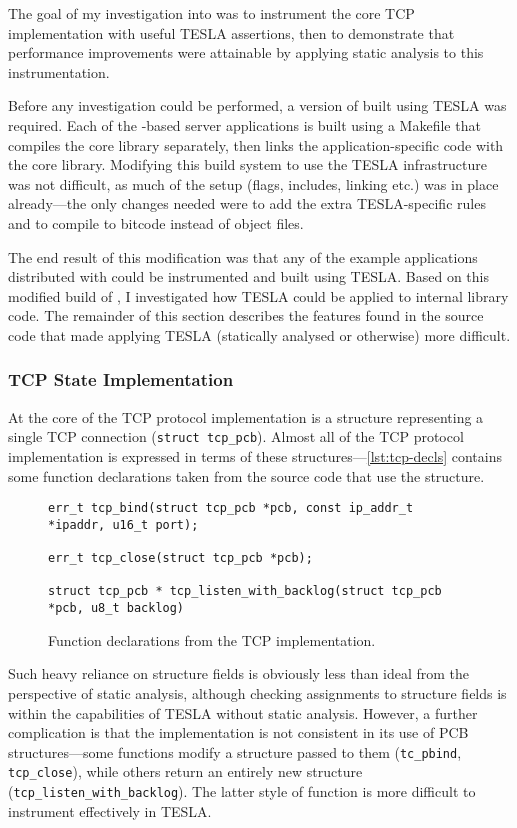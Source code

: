 The goal of my investigation into \lwip{} was to instrument the core TCP
implementation with useful TESLA assertions, then to demonstrate that
performance improvements were attainable by applying static analysis to
this instrumentation.

Before any investigation could be performed, a version of \lwip{} built using TESLA
was required. Each of the \lwip{}-based server applications is built using a
Makefile that compiles the core library separately, then links the
application-specific code with the core library. Modifying this build system to
use the TESLA infrastructure was not difficult, as much of the setup (flags,
includes, linking etc.) was in place already---the only changes needed were to
add the extra TESLA-specific rules and to compile to bitcode instead of object
files.

The end result of this modification was that any of the example applications
distributed with \lwip{} could be instrumented and built using TESLA. Based on
this modified build of \lwip{}, I investigated how TESLA could be applied to
internal library code. The remainder of this section describes the features
found in the source code that made applying TESLA (statically analysed or
otherwise) more difficult.

\subsubsection{TCP State Implementation}

At the core of the TCP protocol implementation is a structure
representing a single TCP connection (\texttt{struct tcp_pcb}).
Almost all of the TCP protocol implementation is expressed in terms of
these structures---\autoref{lst:tcp-decls} contains some function
declarations taken from the source code that use the structure.

\begin{figure}
  \begin{verbatim}
err_t tcp_bind(struct tcp_pcb *pcb, const ip_addr_t *ipaddr, u16_t port);

err_t tcp_close(struct tcp_pcb *pcb);

struct tcp_pcb * tcp_listen_with_backlog(struct tcp_pcb *pcb, u8_t backlog)
  \end{verbatim}
  \caption{Function declarations from the \lwip{} TCP implementation.}
  \label{lst:tcp-decls}
\end{figure}

Such heavy reliance on structure fields is obviously less than ideal from the
perspective of static analysis, although checking assignments to structure
fields is within the capabilities of TESLA without static analysis. However, a
further complication is that the implementation is not consistent in its use of
PCB structures---some functions modify a structure passed to them
(\texttt{tc_pbind}, \texttt{tcp_close}), while others return an
entirely new structure (\texttt{tcp_listen_with_backlog}). The latter
style of function is more difficult to instrument effectively in TESLA.

